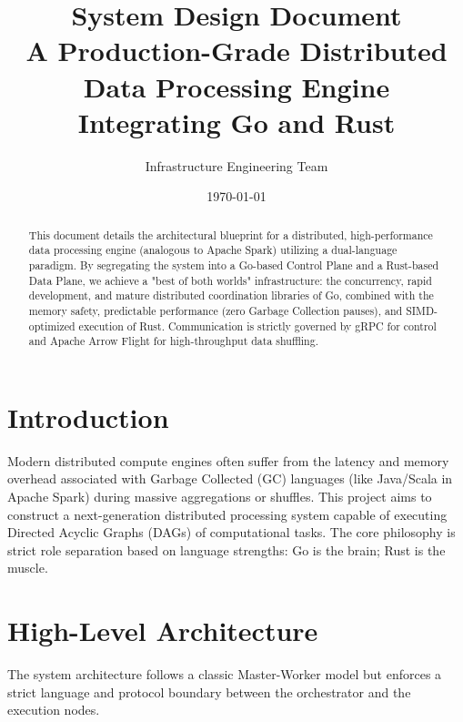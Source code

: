 \documentclass[11pt, a4paper]{article}
\title{\textbf{System Design Document} \\ \Large A Production-Grade Distributed Data Processing Engine Integrating Go and Rust}
\author{Infrastructure Engineering Team}
\date{\today}
\begin{document}
\maketitle

\begin{abstract}
This document details the architectural blueprint for a distributed, high-performance data processing engine (analogous to Apache Spark) utilizing a dual-language paradigm. By segregating the system into a Go-based Control Plane and a Rust-based Data Plane, we achieve a "best of both worlds" infrastructure: the concurrency, rapid development, and mature distributed coordination libraries of Go, combined with the memory safety, predictable performance (zero Garbage Collection pauses), and SIMD-optimized execution of Rust. Communication is strictly governed by gRPC for control and Apache Arrow Flight for high-throughput data shuffling.
\end{abstract}

\tableofcontents
\newpage

\section{Introduction}
Modern distributed compute engines often suffer from the latency and memory overhead associated with Garbage Collected (GC) languages (like Java/Scala in Apache Spark) during massive aggregations or shuffles. This project aims to construct a next-generation distributed processing system capable of executing Directed Acyclic Graphs (DAGs) of computational tasks. The core philosophy is strict role separation based on language strengths: Go is the brain; Rust is the muscle.

\section{High-Level Architecture}
The system architecture follows a classic Master-Worker model but enforces a strict language and protocol boundary between the orchestrator and the execution nodes.
\end{document}
